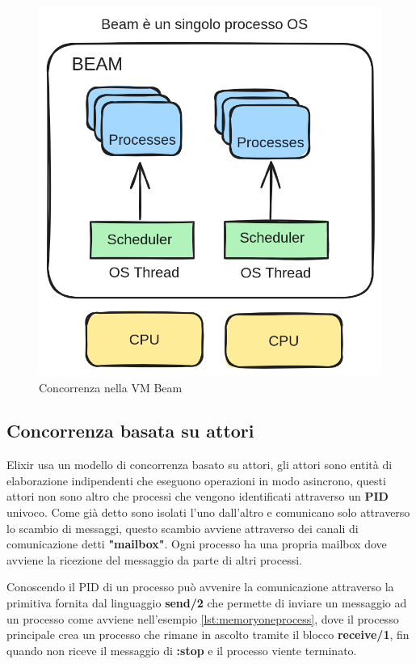 \begin{figure}[!htp]
    \centering
    \includegraphics[keepaspectratio=true,scale=0.25]{images/beam_concurrency.png}
	\caption{Concorrenza nella VM Beam \cite{elixirInAction5}}
  	\label{fig:concorrenza_beam}
\end{figure}



\subsection{Concorrenza basata su attori}

Elixir usa un modello di concorrenza basato su attori,
gli attori sono entità di elaborazione indipendenti
che eseguono operazioni in modo asincrono, questi attori
non sono altro che processi che vengono identificati
attraverso un \textbf{PID} univoco. Come già detto
sono isolati l'uno dall'altro e
comunicano solo attraverso lo scambio di messaggi,
questo scambio avviene attraverso
dei canali di comunicazione detti \textbf{"mailbox"}.
Ogni processo ha una propria mailbox dove avviene la
ricezione del messaggio da parte di altri processi.

Conoscendo il PID di un processo può avvenire la comunicazione
attraverso la primitiva fornita dal linguaggio \textbf{send/2}
che permette di inviare un messaggio ad un processo
come avviene nell'esempio \ref{lst:memoryoneprocess}, dove
il processo principale crea un processo che rimane in ascolto
tramite il blocco \textbf{receive/1},
fin quando non riceve il messaggio di \textbf{:stop} e il processo
viente terminato.

